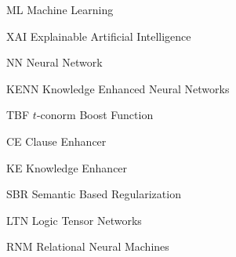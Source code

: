 \begin{abbreviations}
\item[ML] Machine Learning
\item[XAI] Explainable Artificial Intelligence
\item[NN] Neural Network
\item[KENN] Knowledge Enhanced Neural Networks
\item[TBF] $t$-conorm Boost Function
\item[CE] Clause Enhancer
\item[KE] Knowledge Enhancer
\item[SBR] Semantic Based Regularization
\item[LTN] Logic Tensor Networks
\item[RNM] Relational Neural Machines
\end{abbreviations}

